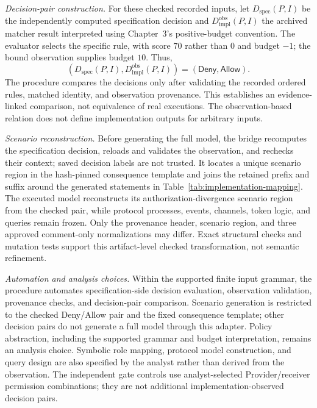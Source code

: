 \emph{Decision-pair construction.} For these checked recorded inputs, let
$D_{\mathrm{spec}}(P,I)$ be the independently computed specification decision
and $D_{\mathrm{impl}}^{\mathrm{obs}}(P,I)$ the archived matcher result
interpreted using Chapter~3's positive-budget convention. The evaluator
selects the specific rule, with score $70$ rather than $0$ and budget $-1$;
the bound observation supplies budget $10$. Thus,
\[
 (D_{\mathrm{spec}}(P,I),D_{\mathrm{impl}}^{\mathrm{obs}}(P,I))
       =(\mathsf{Deny},\mathsf{Allow}).
\]
The procedure compares the decisions only after validating the recorded
ordered rules, matched identity, and observation provenance. This establishes
an evidence-linked comparison, not equivalence of real executions. The
observation-based relation does not define implementation outputs for
arbitrary inputs.

\emph{Scenario reconstruction.} Before generating the full model, the bridge
recomputes the specification decision, reloads and validates the observation,
and rechecks their context; saved decision labels are not trusted. It locates
a unique scenario region in the hash-pinned consequence template and joins
the retained prefix and suffix around the generated statements in
Table~\ref{tab:implementation-mapping}. The executed model reconstructs its
authorization-divergence scenario region from the checked pair, while
protocol processes, events, channels, token logic, and queries remain frozen.
Only the provenance header, scenario region, and three approved comment-only
normalizations may differ. Exact structural checks and mutation tests support
this artifact-level checked transformation, not semantic refinement.

\emph{Automation and analysis choices.} Within the supported finite input
grammar, the procedure automates specification-side decision evaluation,
observation validation, provenance checks, and decision-pair comparison.
Scenario generation is restricted to the checked Deny/Allow pair and the
fixed consequence template; other decision pairs do not generate a full
model through this adapter. Policy abstraction, including the supported
grammar and budget interpretation, remains an analysis choice. Symbolic role
mapping, protocol model construction, and query design are also specified by
the analyst rather than derived from the observation. The independent gate
controls use analyst-selected Provider/receiver permission combinations;
they are not additional implementation-observed decision pairs.

